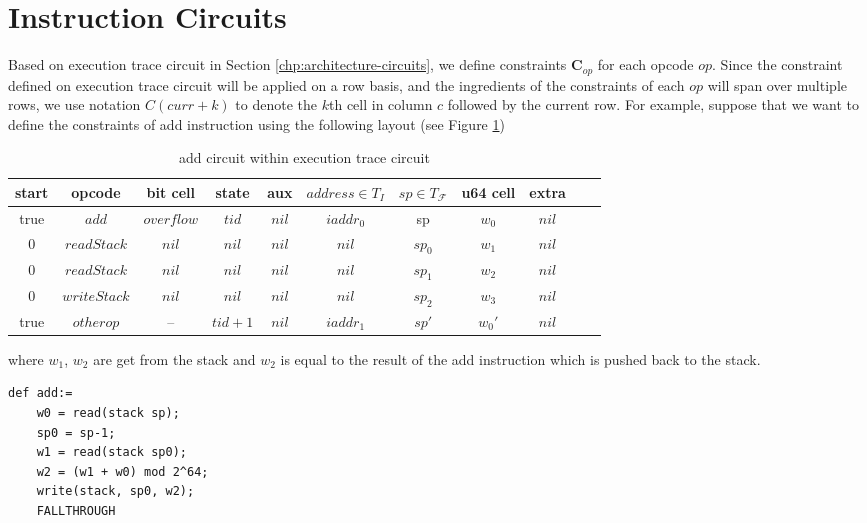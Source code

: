 \section{Instruction Circuits}
Based on execution trace circuit in Section \ref{chp:architecture-circuits}, we define constraints $\mathbf{C}_{op}$ for each opcode $op$. Since the constraint defined on execution trace circuit will be applied on a row basis, and the ingredients of the constraints of each $op$ will span over multiple rows, we use notation $C(curr+k)$ to denote the $k$th cell in column $c$ followed by the current row. For example, suppose that we want to define the constraints of add instruction using the following layout (see Figure \ref{tbl:add-instruction})
\begin{table}[h]
\begin{center}
\begin{tabular}{ | c | c | c | c | c | c | c | c | c | c | c | }
  \hline
  start & opcode & bit cell & state & aux & $address \in T_{I}$ & $sp \in T_\mathcal{F}$& u64 cell & extra \\ 
  \hline
   true & $add$ & $overflow$ & $tid$ & $nil$ & $iaddr_0$ & sp & $w_0$ & $nil$\\ 
 \hline
   0 & $readStack$ & $nil$ & $nil$ & $nil$ & $nil$ & $sp_0$ & $w_1$ & $nil$\\ 
 \hline
   0 & $readStack$ & $nil$ & $nil$ & $nil$ & $nil$ & $sp_1$ & $w_2$ & $nil$\\ 
 \hline
   0 & $writeStack$ & $nil$ & $nil$ & $nil$ & $nil$ & $sp_2$ & $w_3$ & $nil$\\ 
 \hline
   true & $otherop$ & -- & $tid+1$ & $nil$ & $iaddr_1$ & $sp'$ & $w_0'$ & $nil$\\
 \hline
\end{tabular}
\caption{add circuit within execution trace circuit}
\label{tbl:add-instruction}
\end{center}
\end{table}

\noindent where $w_1$, $w_2$ are get from the stack and $w_2$ is equal to the result of the add instruction which is pushed back to the stack.
\begin{verbatim}
def add:=
    w0 = read(stack sp);
    sp0 = sp-1;
    w1 = read(stack sp0);
    w2 = (w1 + w0) mod 2^64;
    write(stack, sp0, w2);
    FALLTHROUGH
\end{verbatim}

